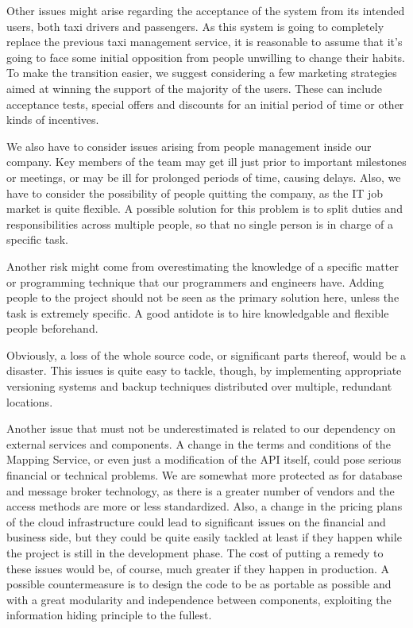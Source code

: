 Other issues might arise regarding the acceptance of the system from its intended users, both taxi drivers and passengers. As this system is going to completely replace the previous taxi management service, it is reasonable to assume that it's going to face some initial opposition from people unwilling to change their habits. To make the transition easier, we suggest considering a few marketing strategies aimed at winning the support of the majority of the users. These can include acceptance tests, special offers and discounts for an initial period of time or other kinds of incentives. 

We also have to consider issues arising from people management inside our company. Key members of the team may get ill just prior to important milestones or meetings, or may be ill for prolonged periods of time, causing delays. Also, we have to consider the possibility of people quitting the company, as the IT job market is quite flexible. A possible solution for this problem is to split duties and responsibilities across multiple people, so that no single person is in charge of a specific task. 

Another risk might come from overestimating the knowledge of a specific matter or programming technique that our programmers and engineers have. Adding people to the project should not be seen as the primary solution here, unless the task is extremely specific. A good antidote is to hire knowledgable and flexible people beforehand.

Obviously, a loss of the whole source code, or significant parts thereof, would be a disaster. This issues is quite easy to tackle, though, by implementing appropriate versioning systems and backup techniques distributed over multiple, redundant locations.

Another issue that must not be underestimated is related to our dependency on external services and components. A change in the terms and conditions of the Mapping Service, or even just a modification of the API itself, could pose serious financial or technical problems. We are somewhat more protected as for database and message broker technology, as there is a greater number of vendors and the access methods are more or less standardized. Also, a change in the pricing plans of the cloud infrastructure could lead to significant issues on the financial and business side, but they could be quite easily tackled at least if they happen while the project is still in the development phase. The cost of putting a remedy to these issues would be, of course, much greater if they happen in production. A possible countermeasure is to design the code to be as portable as possible and with a great modularity and independence between components, exploiting the information hiding principle to the fullest. 

